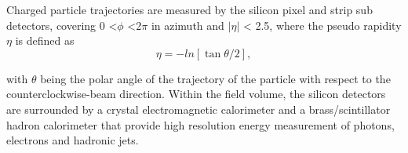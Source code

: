
 Charged particle trajectories are measured by the silicon pixel and strip sub detectors, covering 0 <$\phi$ <2$\pi$ in azimuth and $|\eta|$ < 2.5, where the pseudo rapidity $\eta$ is defined as 
 \begin{equation*}
     \eta = -ln[\tan \theta/2],
 \end{equation*}
 
 with $\theta$ being the polar angle of the trajectory of the particle with respect to the counterclockwise-beam direction. Within the field
volume, the silicon detectors are surrounded by a crystal electromagnetic calorimeter and a brass/scintillator hadron calorimeter that provide high resolution energy measurement of photons, electrons and hadronic jets.

\setcounter{equation}{0}
\setcounter{table}{0}
\setcounter{figure}{0}


    



